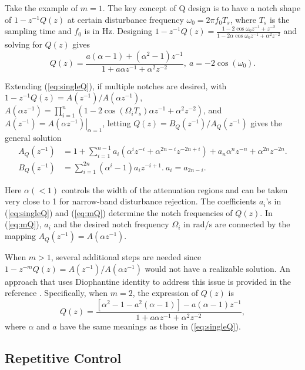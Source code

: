 \documentclass [11pt, proquest] {uwthesis}[2020/02/24]
\begin{document}
Take the example of $m=1$. The key concept of Q design is to have
a notch shape of $1-z^{-1}Q(z)$ at certain disturbance frequency
$\omega_{0}=2\pi f_{0}T_{s}$, where $T_{s}$ is the sampling time
and $f_{0}$ is in Hz. Designing $1-z^{-1}Q(z)=\frac{1-2\cos\omega_{0}z^{-1}+z^{-2}}{1-2\alpha\cos\omega_{0}z^{-1}+\alpha^{2}z^{-2}}$
and solving for $Q(z)$ gives
\begin{equation}
Q(z)=\frac{a(\alpha-1)+(\alpha^{2}-1)z^{-1}}{1+a\alpha z^{-1}+\alpha^{2}z^{-2}},\ a=-2\cos(\omega_{0}).\label{eq:singleQ}
\end{equation}

Extending (\ref{eq:singleQ}), if multiple notches are desired, with
$1-z^{-1}Q(z)=A(z^{-1})/A(\alpha z^{-1})$, $A(\alpha z^{-1})=\prod_{i=1}^{n}(1-2\cos(\Omega_{i}T_{s})\alpha z^{-1}+\alpha^{2}z^{-2})$,
and $A(z^{-1})=\left.A(\alpha z^{-1})\right|_{\alpha=1}$, letting
$Q(z)=B_{Q}(z^{-1})/A_{Q}(z^{-1})$ gives the general solution
\begin{align}
A_{Q}(z^{-1}) & =1+\sum_{i=1}^{n-1}a_{i}(\alpha^{i}z^{-i}+\alpha^{2n-i}z^{-2n+i})+a_{n}\alpha^{n}z^{-n}+\alpha^{2n}z^{-2n}.\nonumber \\
B_{Q}(z^{-1}) & =\sum_{i=1}^{2n}(\alpha^{i}-1)a_{i}z^{-i+1}.\ a_{i}=a_{2n-i}.\label{eq:mQ}
\end{align}


Here $\alpha(<1)$ controls the width of the attenuation regions and
can be taken very close to 1 for narrow-band disturbance rejection.
The coefficients $a_{i}$'s in (\ref{eq:singleQ}) and (\ref{eq:mQ})
determine the notch frequencies of $Q(z)$. In (\ref{eq:mQ}), $a_{i}$
and the desired notch frequency $\Omega_{i}$ in rad/s are connected
by the mapping $A_{Q}(z^{-1})=A(\alpha z^{-1})$. 

When $m>1$, several additional steps are needed since $1-z^{-m}Q(z)=A(z^{-1})/A(\alpha z^{-1})$
would not have a realizable solution. An approach that uses Diophantine
identity to address this issue is provided in the reference \cite{XuChen_TCST2012}.
Specifically, when $m=2$, the expression of $Q(z)$ is
\begin{equation}
Q(z)=\frac{\left[\alpha^{2}-1-a^{2}(\alpha-1)\right]-a(\alpha-1)z^{-1}}{1+a\alpha z^{-1}+\alpha^{2}z^{-2}},\label{eq:singleQ_m_2}
\end{equation}
where $\alpha$ and $a$ have the same meanings as those in (\ref{eq:singleQ}).

\subsection{Repetitive Control} \label{subsec:repetitive-control}
\end{document}
